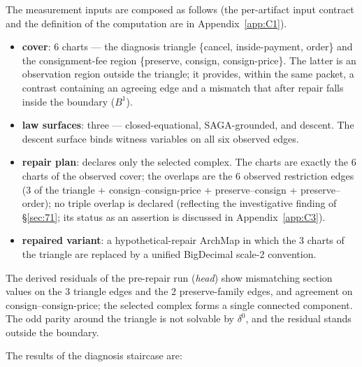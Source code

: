 The measurement inputs are composed as follows (the per-artifact input contract and
the definition of the computation are in Appendix~\ref{app:C1}).
\begin{itemize}
\item \textbf{cover}: 6 charts --- the diagnosis triangle
\{cancel, inside-payment, order\} and the consignment-fee region
\{preserve, consign, consign-price\}. The latter is an observation
region outside the triangle; it provides, within the same packet, a
contrast containing an agreeing edge and a mismatch that after repair
falls inside the boundary ($B^1$).
\item \textbf{law surfaces}: three --- closed-equational,
SAGA-grounded, and descent. The descent surface binds witness
variables on all six observed edges.
\item \textbf{repair plan}: declares only the selected complex. The
charts are exactly the 6 charts of the observed cover; the overlaps
are the 6 observed restriction edges (3 of the triangle +
consign--consign-price + preserve--consign + preserve--order); no
triple overlap is declared (reflecting the investigative finding of
\S\ref{sec:71}; its status as an assertion is discussed in
Appendix~\ref{app:C3}).
\item \textbf{repaired variant}: a hypothetical-repair ArchMap in
which the 3 charts of the triangle are replaced by a unified
BigDecimal scale-2  convention.
\end{itemize}

The derived residuals of the pre-repair run (\emph{head}) show mismatching section values on the 3
triangle edges and the 2 preserve-family edges, and agreement on
consign--consign-price; the selected complex forms a single connected
component. The odd parity around the triangle is not solvable by
$\delta^0$, and the residual stands outside the boundary.

The results of the diagnosis staircase are:

